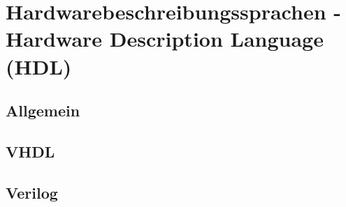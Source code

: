\chapter{Hardwarebeschreibungssprachen - Hardware Description Language (HDL)}

\section{Allgemein}

\section{VHDL}

\section{Verilog}
